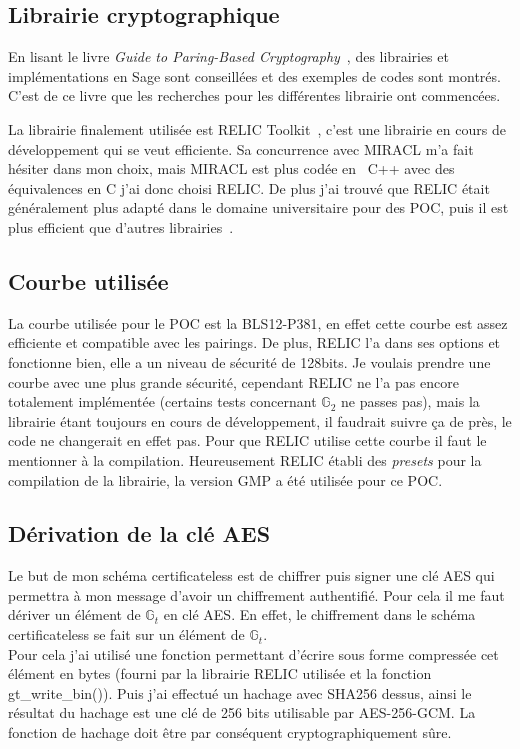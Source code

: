 \subsection{Librairie cryptographique}
En lisant le livre \textit{Guide to Paring-Based Cryptography}~\cite{bookPairing}, des librairies et implémentations en Sage sont conseillées et des exemples de codes sont montrés. C'est de ce livre que les recherches pour les différentes librairie ont commencées.

La librairie finalement utilisée est RELIC Toolkit~\cite{relic-toolkit}, c'est une librairie en cours de développement qui se veut efficiente. Sa concurrence avec MIRACL m'a fait hésiter dans mon choix, mais MIRACL est plus codée en~ C++ avec des équivalences en C j'ai donc choisi RELIC. De plus j'ai trouvé que RELIC était généralement plus adapté dans le domaine universitaire pour des POC, puis il est plus efficient que d'autres librairies~\cite{performanceRELIC}.
\subsection{Courbe utilisée}
La courbe utilisée pour le POC est la BLS12-P381, en effet cette courbe est assez efficiente et compatible avec les pairings. De plus, RELIC l'a dans ses options et fonctionne bien, elle a un niveau de sécurité de 128bits. Je voulais prendre une courbe avec une plus grande sécurité, cependant RELIC ne l'a pas encore totalement implémentée (certains tests concernant $\mathbb{G}_2$ ne passes pas), mais la librairie étant toujours en cours de développement, il faudrait suivre ça de près, le code ne changerait en effet pas. Pour que RELIC utilise cette courbe il faut le mentionner à la compilation. Heureusement RELIC établi des \textit{presets} pour la compilation de la librairie, la version GMP a été utilisée pour ce POC.

\subsection{Dérivation de la clé AES}
Le but de mon schéma certificateless est de chiffrer puis signer une clé AES qui permettra à mon message d'avoir un chiffrement authentifié. Pour cela il me faut dériver un élément de $\mathbb{G}_t$ en clé AES. En effet, le chiffrement dans le schéma certificateless se fait sur un élément de $\mathbb{G}_t$.\\
Pour cela j'ai utilisé une fonction permettant d'écrire sous forme compressée cet élément en bytes (fourni par la librairie RELIC utilisée et la fonction gt\_write\_bin()). Puis j'ai effectué un hachage avec SHA256 dessus, ainsi le résultat du hachage est une clé de 256 bits utilisable par AES-256-GCM. La fonction de hachage doit être par conséquent cryptographiquement sûre.

